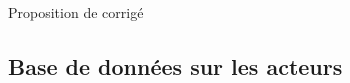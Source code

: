 
\vspace{0.1cm}
\begin{huge}
 Proposition de corrigé
\end{huge}

\subsection{Base de données sur les acteurs}
\setcounter{thequestion}{0}
